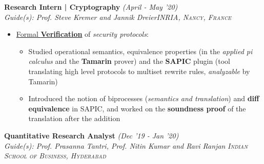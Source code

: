 \documentclass{article}
\begin{document}
\vspace{-5pt}
\textbf{Research Intern | Cryptography} \hfill{\sl \small (April - May '20)}
\vspace{-1pt}\\
{\it Guide(s): Prof. Steve Kremer and Jannik Dreier}\hfill{\sl \small \textsc{INRIA, Nancy, France}}\\
\vspace{-19pt}
\begin{itemize}[itemsep = -1 mm, leftmargin=*]
    \item \underline{Formal {\bf Verification}} of \textsl{security protocols}: 
    \vspace{-7pt}
    \begin{itemize}[itemsep = -0.6 mm, leftmargin=*]
    \item Studied operational semantics, equivalence properties (in the \textit{applied pi calculus} and the \textbf{Tamarin} prover) and the\vspace{-0.3mm} \textbf{SAPIC} plugin (tool translating high level protocols to multiset rewrite rules, {\it analyzable} by Tamarin)
    \item Introduced the notion of biprocesses (\textit{semantics and translation}) and {\bf diff equivalence} in SAPIC, and worked on the\vspace{-0.3mm} \textbf{soundness proof} of the translation after the addition 
    \end{itemize}
\end{itemize}
\vspace{-4pt}
\textbf{Quantitative Research Analyst} \hfill{\sl \small (Dec '19 - Jan '20)}
\vspace{-1pt}\\
{\it Guide(s): Prof. Prasanna Tantri, Prof. Nitin Kumar and Ravi Ranjan  }\hfill{\sl \small \textsc{Indian School of Business, Hyderabad}}\\
\vspace{-19pt}
\end{document}
